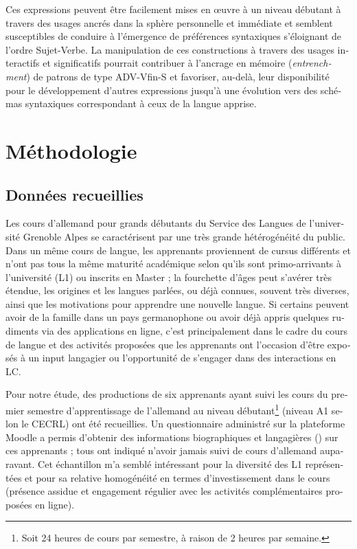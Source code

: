 \documentclass[output=paper]{langscibook}
\begin{document}
\begin{otherlanguage}{french}
\begin{sloppypar}
Ces expressions peuvent être facilement mises en œuvre à un niveau débutant à travers des usages ancrés dans la sphère personnelle et immédiate et semblent susceptibles de conduire à l’émergence de préférences syntaxiques s’éloignant de l’ordre Sujet-Verbe. La manipulation de ces constructions à travers des usages interactifs et significatifs pourrait contribuer à l’ancrage en mémoire (\textit{entrenchment}) de patrons de type ADV-Vfin-S et favoriser, au-delà, leur disponibilité pour le développement d’autres expressions jusqu’à une évolution vers des schémas syntaxiques correspondant à ceux de la langue apprise.
\end{sloppypar}

\section{Méthodologie}\label{sec:felce:5}
\subsection{Données recueillies}\label{sec:felce:5.1}

Les cours d’allemand pour grands débutants du Service des Langues de l’université Grenoble Alpes se caractérisent par une très grande hétérogénéité du public. Dans un même cours de langue, les apprenants proviennent de cursus différents et n’ont pas tous la même maturité académique selon qu’ils sont primo-arrivants à l’université (L1) ou inscrits en Master ; la fourchette d’âges peut s’avérer très étendue, les origines et les langues parlées, ou déjà connues, souvent très diverses, ainsi que les motivations pour apprendre une nouvelle langue. Si certains peuvent avoir de la famille dans un pays germanophone ou avoir déjà appris quelques rudiments via des applications en ligne, c’est principalement dans le cadre du cours de langue et des activités proposées que les apprenants ont l’occasion d’être exposés à un input langagier ou l’opportunité de s’engager dans des interactions en LC. 

Pour notre étude, des productions de six apprenants ayant suivi les cours du premier semestre d’apprentissage de l’allemand au niveau débutant\footnote{\textrm{Soit 24 heures de cours par semestre, à raison de 2 heures par semaine.}} (niveau A1 selon le CECRL) ont été recueillies. Un questionnaire administré sur la plateforme Moodle a permis d’obtenir des informations biographiques et langagières () sur ces apprenants ; tous ont indiqué n’avoir jamais suivi de cours d’allemand auparavant. Cet échantillon m'a semblé intéressant pour la diversité des L1 représentées et pour sa relative homogénéité en termes d’investissement dans le cours (présence assidue et engagement régulier avec les activités complémentaires proposées en ligne).


\end{otherlanguage}
\end{document}
